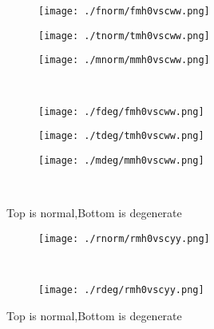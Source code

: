 \documentclass[aps,floats,floatfix,nofootinbib]{revtex4-1}
\begin{document}
\begin{center}
\begin{figure}
\begin{subfigure}{0.3\textwidth}
\texttt{[image: ./fnorm/fmh0vscww.png]}
\label{}
\end{subfigure}
\begin{subfigure}{0.3\textwidth}
\texttt{[image: ./tnorm/tmh0vscww.png]}
\label{}
\end{subfigure}
\begin{subfigure}{0.3\textwidth}
\texttt{[image: ./mnorm/mmh0vscww.png]}
\label{}
\end{subfigure}\\
\begin{subfigure}{0.3\textwidth}
\texttt{[image: ./fdeg/fmh0vscww.png]}
\label{}
\end{subfigure}
\begin{subfigure}{0.3\textwidth}
\texttt{[image: ./tdeg/tmh0vscww.png]}
\label{}
\end{subfigure}
\begin{subfigure}{0.3\textwidth}
\texttt{[image: ./mdeg/mmh0vscww.png]}
\label{}
\end{subfigure}\\
\caption{Top is normal,Bottom is degenerate}
\end{figure}
\end{center}

\begin{center}
\begin{figure}
\begin{subfigure}{0.95\textwidth}
\texttt{[image: ./rnorm/rmh0vscyy.png]}
\label{}
\end{subfigure}\\
\begin{subfigure}{0.95\textwidth}
\texttt{[image: ./rdeg/rmh0vscyy.png]}
\label{}
\end{subfigure}
\caption{Top is normal,Bottom is degenerate}
\end{figure}
\end{center}
\end{document}
